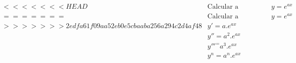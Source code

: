 \begin{ex}
\begin{align}
<<<<<<< HEAD
&\text{Calcular a n'�sima derivada de }\quad y=e^{ax}\nonumber\\
=======
&\text{Calcular a n'�sima derivada de }\quad y=e^{ax}\nonumber\\
>>>>>>> 2edfa61f09aa52eb0e5cbaaba256a294c2d4af48
&y'=a.e^{ax}\nonumber\\
&y''=a^2.e^{ax}\nonumber\\
&y'''^=a^3.e^{ax}\nonumber\\
&y^{n}=a^{n}.e^{ax}\nonumber
\end{align}
\end{ex}